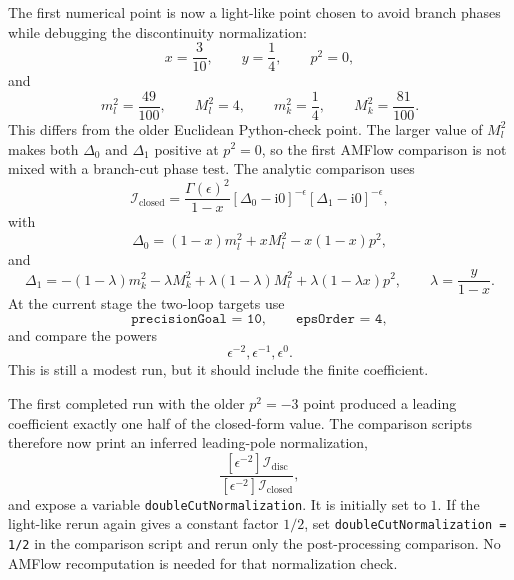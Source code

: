 \documentclass[11pt]{article}
\newcommand{\ii}{\mathrm{i}}
\newcommand{\eps}{\epsilon}
\newcommand{\WL}[1]{\texttt{#1}}
\begin{document}
The first numerical point is now a light-like point chosen to avoid branch
phases while debugging the discontinuity normalization:
\begin{equation}
  x=\frac{3}{10},\qquad y=\frac14,\qquad p^2=0,
\end{equation}
and
\begin{equation}
  m_l^2=\frac{49}{100},\qquad
  M_l^2=4,\qquad
  m_k^2=\frac14,\qquad
  M_k^2=\frac{81}{100}.
\end{equation}
This differs from the older Euclidean Python-check point. The larger value of
\(M_l^2\) makes both \(\Delta_0\) and \(\Delta_1\) positive at \(p^2=0\), so
the first AMFlow comparison is not mixed with a branch-cut phase test.
The analytic comparison uses
\begin{equation}
  \mathcal I_{\mathrm{closed}}
  =
  \frac{\Gamma(\eps)^2}{1-x}
  [\Delta_0-\ii0]^{-\eps}
  [\Delta_1-\ii0]^{-\eps},
\end{equation}
with
\begin{equation}
  \Delta_0=(1-x)m_l^2+xM_l^2-x(1-x)p^2,
\end{equation}
and
\begin{equation}
  \Delta_1=
  -\left(1-\lambda\right)m_k^2-\lambda M_k^2
  +\lambda(1-\lambda)M_l^2
  +\lambda(1-\lambda x)p^2,
  \qquad
  \lambda=\frac{y}{1-x}.
\end{equation}
At the current stage the two-loop targets use
\begin{equation}
  \WL{precisionGoal = 10},\qquad \WL{epsOrder = 4},
\end{equation}
and compare the powers
\begin{equation}
  \eps^{-2},\eps^{-1},\eps^0.
\end{equation}
This is still a modest run, but it should include the finite coefficient.

The first completed run with the older \(p^2=-3\) point produced a leading
coefficient exactly one half of the closed-form value. The comparison scripts
therefore now print an inferred leading-pole normalization,
\begin{equation}
  \frac{[\eps^{-2}]\mathcal I_{\mathrm{disc}}}
       {[\eps^{-2}]\mathcal I_{\mathrm{closed}}},
\end{equation}
and expose a variable \WL{doubleCutNormalization}. It is initially set to
\(1\). If the light-like rerun again gives a constant factor \(1/2\), set
\WL{doubleCutNormalization = 1/2} in the comparison script and rerun only the
post-processing comparison. No AMFlow recomputation is needed for that
normalization check.
\end{document}

